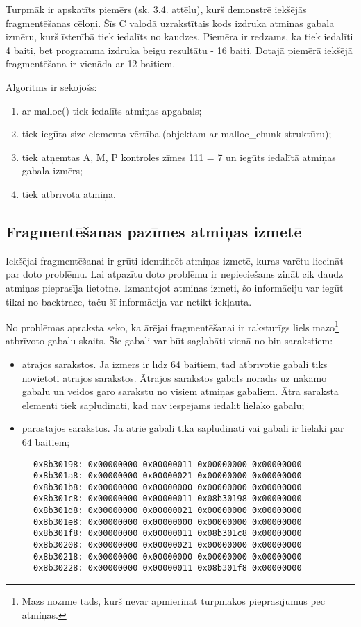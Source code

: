 Turpmāk ir apskatīts piemērs (sk. 3.4. attēlu), kurš demonstrē iekšējās fragmentēšanas cēloņi.
Šīs C valodā uzrakstītais kods izdruka atmiņas gabala izmēru, kurš īstenībā tiek iedalīts no kaudzes.
Piemēra ir redzams, ka tiek iedalīti 4 baiti, bet programma izdruka beigu rezultātu - 16 baiti.
Dotajā piemērā iekšējā fragmentēšana ir vienāda ar 12 baitiem.

Algoritms ir sekojošs: 
\begin{enumerate}
\item ar malloc() tiek iedalīts atmiņas apgabals;
\item  tiek iegūta size elementa vērtība (objektam ar malloc\_chunk struktūru);
\item  tiek atņemtas A, M, P kontroles zīmes 111 = 7 un iegūts iedalītā atmiņas  gabala izmērs;
\item  tiek atbrīvota atmiņa.
\end{enumerate}



\subsection{Fragmentēšanas pazīmes atmiņas izmetē}

Iekšējai fragmentēšanai ir grūti identificēt atmiņas izmetē, kuras varētu liecināt par doto problēmu.
Lai atpazītu doto problēmu ir nepieciešams zināt cik daudz atmiņas pieprasīja lietotne.
Izmantojot atmiņas izmeti, šo informāciju var iegūt tikai no backtrace, taču šī informācija var netikt iekļauta.

No problēmas apraksta seko, ka ārējai fragmentēšanai ir raksturīgs liels mazo\footnote{Mazs nozīme tāds, kurš nevar apmierināt turpmākos pieprasījumus pēc atmiņas.} atbrīvoto gabalu skaits.
Šie gabali var būt saglabāti vienā no bin sarakstiem:
\begin{itemize}
\item ātrajos sarakstos. Ja izmērs ir līdz 64 baitiem, tad atbrīvotie gabali tiks novietoti ātrajos sarakstos.
Ātrajos sarakstos gabals norādīs uz nākamo gabalu un veidos garo sarakstu no visiem atmiņas gabaliem.
Ātra saraksta elementi tiek sapludināti, kad nav iespējams iedalīt lielāko gabalu;
\item parastajos sarakstos. Ja ātrie gabali tika saplūdināti vai gabali ir lielāki par 64 baitiem;
\end{itemize}
\begin{figure}[h]
\begin{lstlisting}[style=customgdb]
0x8b30198: 0x00000000 0x00000011 0x00000000 0x00000000
0x8b301a8: 0x00000000 0x00000021 0x00000000 0x00000000
0x8b301b8: 0x00000000 0x00000000 0x00000000 0x00000000
0x8b301c8: 0x00000000 0x00000011 0x08b30198 0x00000000
0x8b301d8: 0x00000000 0x00000021 0x00000000 0x00000000
0x8b301e8: 0x00000000 0x00000000 0x00000000 0x00000000
0x8b301f8: 0x00000000 0x00000011 0x08b301c8 0x00000000
0x8b30208: 0x00000000 0x00000021 0x00000000 0x00000000
0x8b30218: 0x00000000 0x00000000 0x00000000 0x00000000
0x8b30228: 0x00000000 0x00000011 0x08b301f8 0x00000000
\end{lstlisting}
\caption{\textbf{\fontsize{11}{12}\selectfont {Fragmentētā kaudze}}}
\end{figure}

